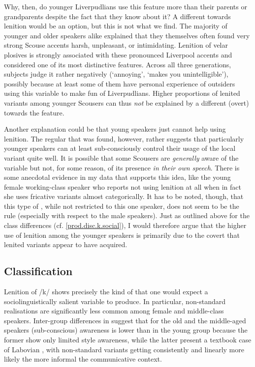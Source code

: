 Why, then, do younger Liverpudlians use this feature more than their parents or grandparents despite the fact that they know about it?
A different  towards lenition would be an option, but this is not what we find.
The majority of younger and older speakers alike explained that they themselves often found very strong Scouse accents harsh, unpleasant, or intimidating.
Lenition of velar plosives is strongly associated with these pronounced Liverpool accents and considered one of its most distinctive features.
Across all three generations, subjects judge it rather negatively (`annoying', `makes you unintelligible'), possibly because at least some of them have personal experience of outsiders using this variable to make fun of Liverpudlians.
Higher proportions of lenited variants among younger Scousers can thus \emph{not} be explained by a different (overt)  towards the feature.

Another explanation could be that young speakers just cannot help using lenition.
The regular  that was found, however, rather suggests that particularly younger speakers can at least sub-consciously control their usage of the local variant quite well.
It is possible that some Scousers are \emph{generally} aware of the variable but not, for some reason, of its presence \emph{in their own speech}.
There is some anecdotal evidence in my data that supports this idea, like the young female working-class speaker who reports not using lenition at all when in fact she uses fricative variants almost categorically.
It has to be noted, though, that this type of , while not restricted to this one speaker, does not seem to be the rule (especially with respect to the male speakers).
Just as outlined above for the class differences (cf. \ref{prod.disc.k.social}), I would therefore argue that the higher use of lenition among the younger speakers is primarily due to the covert  that lenited variants appear to have acquired.

\subsection{Classification}
\label{prod.disc.k.classification}

Lenition of /k/ shows precisely the kind of  that one would expect a sociolinguistically salient variable to produce.
In particular, non-standard realisations are significantly less common among female and middle-class speakers.
Inter-group differences in  suggest that for the old and the middle-aged speakers (sub-conscious) awareness is lower than in the young group because the former show only limited style awareness, while the latter present a textbook case of Labovian , with non-standard variants getting consistently and linearly more likely the more informal the communicative context.


